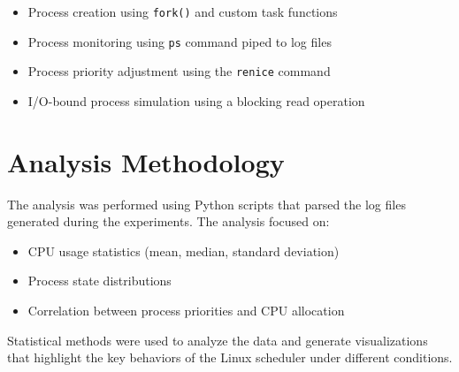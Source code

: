 \documentclass[12pt,a4paper]{article}
\begin{document}
\begin{itemize}
    \item Process creation using \texttt{fork()} and custom task functions
    \item Process monitoring using \texttt{ps} command piped to log files
    \item Process priority adjustment using the \texttt{renice} command
    \item I/O-bound process simulation using a blocking read operation
\end{itemize}

\section{Analysis Methodology}

The analysis was performed using Python scripts that parsed the log files generated during the experiments. The analysis focused on:

\begin{itemize}
    \item CPU usage statistics (mean, median, standard deviation)
    \item Process state distributions
    \item Correlation between process priorities and CPU allocation
\end{itemize}

Statistical methods were used to analyze the data and generate visualizations that highlight the key behaviors of the Linux scheduler under different conditions.
\end{document}
